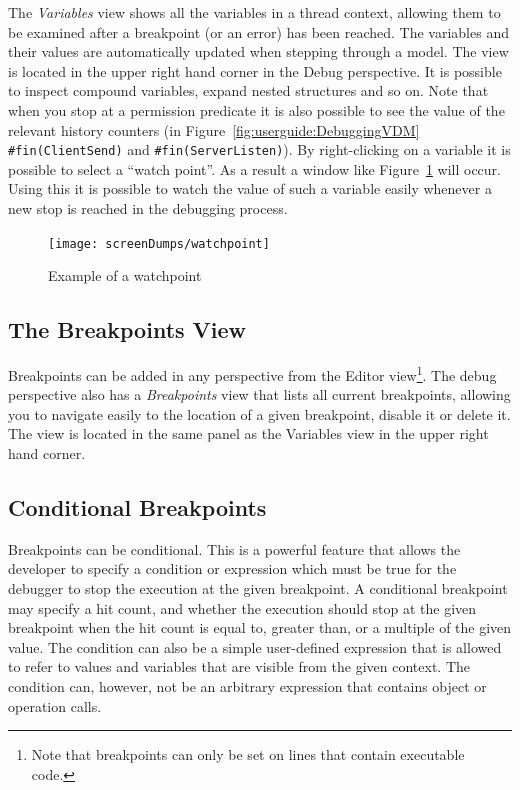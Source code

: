 \documentclass{overturerepchap}
\begin{document}
The \emph{Variables} view shows all the variables in a thread context, allowing them to be
examined after a breakpoint (or an error) has been reached. The variables and their values are
automatically updated when stepping through a model. The view is
located in the upper right hand corner in the Debug perspective. It is
possible to inspect compound variables, expand nested structures and
so on. Note that when you stop at a permission predicate it is also
possible to see the value of the relevant history counters (in
Figure~\ref{fig:userguide:DebuggingVDM} \texttt{\#fin(ClientSend)} and
\texttt{\#fin(ServerListen)}). By right-clicking on a variable it is
possible to select a ``watch point''. As a result a window like
Figure~\ref{fig:watchpoint} will occur. Using this it is possible to
watch the value of such a variable easily whenever a new stop is
reached in the debugging process.

\begin{figure}[htp]
\begin{center}
  \texttt{[image: screenDumps/watchpoint]}
  \caption{Example of a watchpoint}
  \label{fig:watchpoint}
\end{center}
\end{figure}

\subsection{The Breakpoints View}

Breakpoints can be added in any perspective from the Editor view\footnote{Note that
breakpoints can only be set on lines that contain executable code.}.
The debug perspective also has a \emph{Breakpoints} view that lists all current
breakpoints, allowing you to navigate easily to the location of a given breakpoint,
disable it or delete it. The view is located in
the same panel as the Variables view in the upper right hand corner.


\subsection{Conditional Breakpoints}
\label{sec:userguide:breakpoints}

Breakpoints can be conditional. This is a powerful feature that allows
the developer to specify a condition or expression which must be true
for the debugger to stop the execution at the given breakpoint. A
conditional breakpoint may specify a hit count, and whether the
execution should stop at the given breakpoint when the hit count is
equal to, greater than, or a multiple of the given value. The
condition can also be a simple user-defined expression that is allowed
to refer to values and variables that are visible from the given
context. The condition can, however, not be an arbitrary expression
that contains object or operation calls.
\end{document}
